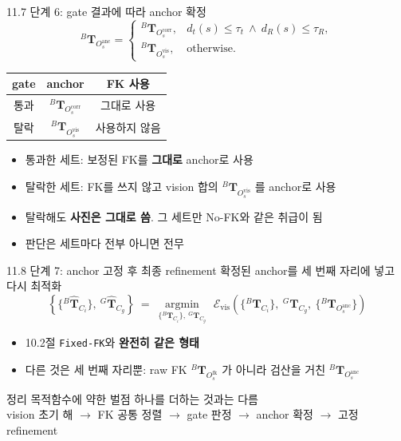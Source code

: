 \documentclass[aspectratio=169,11pt]{beamer}
\newcommand{\T}[3][]{{}^{#2}\mathbf{T}^{#1}_{#3}}   %
\newcommand{\Th}[3][]{{}^{#2}\widehat{\mathbf{T}}^{#1}_{#3}} %
\newcommand{\Ofk}{O^{\mathrm{fk}}}     %
\newcommand{\Ovis}{O^{\mathrm{vis}}}   %
\newcommand{\Ocorr}{O^{\mathrm{corr}}} %
\newcommand{\Oanc}{O^{\mathrm{anc}}}   %
\begin{document}
\begin{frame}{11.7 단계 6: gate 결과에 따라 anchor 확정}
  \[
    \T{B}{\Oanc_s}
    =
    \begin{cases}
      \T{B}{\Ocorr_s},
        & d_t(s)\leq\tau_t \ \land\  d_R(s)\leq\tau_R, \\[6pt]
      \T{B}{\Ovis_s}, & \text{otherwise}.
    \end{cases}
  \]
  \vfill
  \begin{center}
    \begin{tabular}{ccc}
      \toprule
      gate & anchor & FK 사용 \\
      \midrule
      통과 & $\T{B}{\Ocorr_s}$ & 그대로 사용 \\
      탈락 & $\T{B}{\Ovis_s}$ & 사용하지 않음 \\
      \bottomrule
    \end{tabular}
  \end{center}
  \vfill
  \begin{itemize}
    \item 통과한 세트: 보정된 FK를 \textbf{그대로} anchor로 사용
    \item 탈락한 세트: FK를 쓰지 않고 vision 합의 $\T{B}{\Ovis_s}$ 를 anchor로 사용
    \item 탈락해도 \textbf{사진은 그대로 씀}. 그 세트만 No-FK와 같은 취급이 됨
    \item 판단은 세트마다 전부 아니면 전무
  \end{itemize}
\end{frame}

\begin{frame}{11.8 단계 7: anchor 고정 후 최종 refinement}
  확정된 anchor를 세 번째 자리에 넣고 다시 최적화
  {\footnotesize
  \[
    \left\{
      \{\Th{B}{C_i}\},\ \Th{G}{C_g}
    \right\}
    \ =\
    \underset{
      \{\T{B}{C_i}\},\ \T{G}{C_g}
    }{\operatorname{argmin}}
    \ \,
    \mathcal{E}_{\mathrm{vis}}
    \left(
      \{\T{B}{C_i}\},\ \T{G}{C_g},\ \{\T{B}{\Oanc_s}\}
    \right)
  \]
  }
  \begin{itemize}
    \item 10.2절 \texttt{Fixed-FK}와 \textbf{완전히 같은 형태}
    \item 다른 것은 세 번째 자리뿐:
      raw FK $\T{B}{\Ofk_s}$ 가 아니라 검산을 거친 $\T{B}{\Oanc_s}$
  \end{itemize}
  \vfill
  \begin{alertblock}{정리}
    목적함수에 약한 벌점 하나를 더하는 것과는 다름\\
    vision 초기 해 $\rightarrow$ FK 공통 정렬 $\rightarrow$ gate 판정
    $\rightarrow$ anchor 확정 $\rightarrow$ 고정 refinement
  \end{alertblock}
\end{frame}
\end{document}
